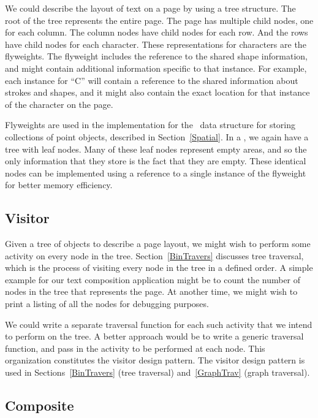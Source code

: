 We could describe the layout of text on a page by using a
tree structure.
The root of the tree represents the entire page.
The page has multiple child nodes, one for each column.
The column nodes have child nodes for each row.
And the rows have child nodes for each character.
These representations for characters are the flyweights.
The flyweight includes the reference to the shared shape information,
and might contain additional information specific to that instance.
For example, each instance for ``C'' will contain a reference to the
shared information about strokes and shapes, and it might also contain
the exact location for that instance of the character on the page.

Flyweights are used in the implementation for the \PRquad\ data
structure for storing collections of point objects, described in
Section~\ref{Spatial}.
In a \PRquad, we again have a tree with leaf nodes.
Many of these leaf nodes represent empty areas, and so the only
information that they store is the fact that they are empty.
These identical nodes can be implemented using a reference to a single
instance of the flyweight for better memory efficiency.

\subsection{Visitor}
\label{VisitorPatt}

Given a tree of objects to describe a page layout,
we might wish to perform some activity on every node in the tree.
Section~\ref{BinTravers} discusses tree traversal, which is the
process of visiting every node in the tree in a defined order.
A simple example for our text composition application might be to
count the number of nodes in the tree that represents the page.
At another time, we might wish to print a listing of all the nodes for
debugging purposes.

We could write a separate traversal function for each such activity
that we intend to perform on the tree.
A better approach would be to write a generic traversal function, and
pass in the activity to be performed at each node.
This organization constitutes the visitor design pattern.
The visitor design pattern is used in Sections~\ref{BinTravers}
(tree traversal) and~\ref{GraphTrav} (graph traversal).

\subsection{Composite}
\label{CompositePatt}

